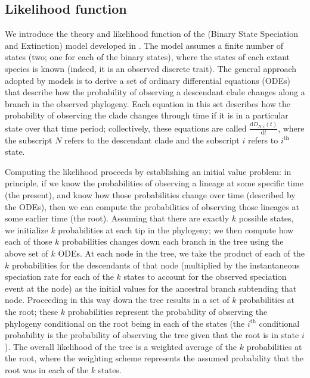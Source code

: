 \subsection{Likelihood function}\label{section:likelihood}
We introduce the theory and likelihood function of the \BiSSE (Binary State Speciation and Extinction) model developed in \cite{Maddison2007}.
The \BiSSE model assumes a finite number of states (two; one for each of the binary states), where the states of each extant species is known (indeed, it is an observed discrete trait).
The general approach adopted by \BiSSE models is to derive a set of ordinary differential equations (ODEs) that describe how the probability of observing a descendant clade changes along a branch in the observed phylogeny.
Each equation in this set describes how the probability of observing the clade changes through time if it is in a particular state over that time period; collectively, these equations are called $\frac{ \mathrm{d}D_{N,i}(t)}{\mathrm{d}t}$, where the subscript $N$ refers to the descendant clade and the subscript $i$ refers to $i^\text{th}$ state.

Computing the likelihood proceeds by establishing an initial value problem: in principle, if we know the probabilities of observing a lineage at some specific time (\EG the present), and know how those probabilities change over time (described by the ODEs), then we can compute the probabilities of observing those lineages at some earlier time (\EG the root).
Assuming that there are exactly $k$ possible states, we initialize $k$ probabilities at each tip in the phylogeny; we then compute how each of those $k$ probabilities changes down each branch in the tree using the above set of $k$ ODEs.
At each node in the tree, we take the product of each of the $k$ probabilities for the descendants of that node (multiplied by the instantaneous speciation rate for each of the $k$ states to account for the observed speciation event at the node) as the initial values for the ancestral branch subtending that node.
Proceeding in this way down the tree results in a set of $k$ probabilities at the root; these $k$ probabilities represent the probability of observing the phylogeny conditional on the root being in each of the states (\IE the $i^\text{th}$ conditional probability is the probability of observing the tree given that the root is in state $i$).
The overall likelihood of the tree is a weighted average of the $k$ probabilities at the root, where the weighting scheme represents the assumed probability that the root was in each of the $k$ states.


